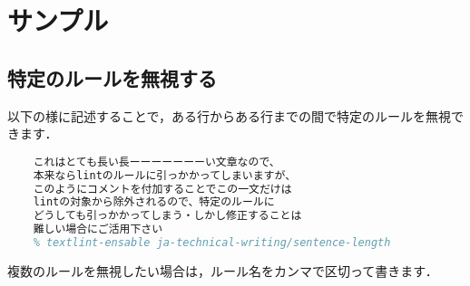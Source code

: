\documentclass[main]{subfiles}
\begin{document}
\section{サンプル}

\subsection{特定のルールを無視する}

以下の様に記述することで，ある行からある行までの間で特定のルールを無視できます．

\begin{lstlisting}[caption=textlint-filter-rule-commentsの使用方法,language=tex,breaklines=true]
    % textlint-disable ja-technical-writing/sentence-length
    これはとても長い長ーーーーーーーい文章なので、
    本来ならlintのルールに引っかかってしまいますが、
    このようにコメントを付加することでこの一文だけは
    lintの対象から除外されるので、特定のルールに
    どうしても引っかかってしまう・しかし修正することは
    難しい場合にご活用下さい
    % textlint-ensable ja-technical-writing/sentence-length
\end{lstlisting}

複数のルールを無視したい場合は，ルール名をカンマで区切って書きます．
\end{document}
